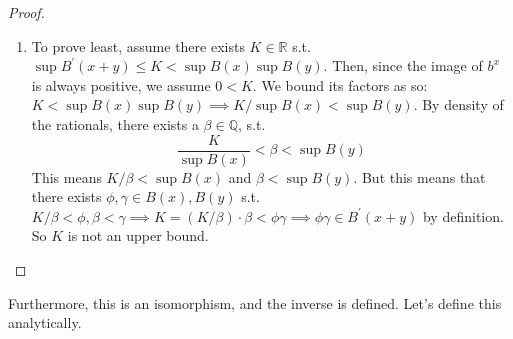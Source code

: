 \begin{proof}
\begin{enumerate}
      \item To prove least, assume there exists $K \in \mathbb{R}$ s.t. $\sup{B^\prime(x + y)} \leq K < \sup{B(x)} \sup{B(y)}$. Then, since the image of $b^x$ is always positive, we assume $0 < K$. We bound its factors as so: $K < \sup{B(x)} \sup{B(y)} \implies K/\sup{B(x)} < \sup{B(y)}$. By density of the rationals, there exists a $\beta \in \mathbb{Q}$, s.t. 
      \begin{equation}
        \frac{K}{\sup{B(x)}} < \beta < \sup{B(y)}
      \end{equation}
      This means $K/\beta < \sup{B(x)}$ and $\beta < \sup{B(y)}$. But this means that there exists $\phi, \gamma \in B(x), B(y)$ s.t. $K/\beta < \phi, \beta < \gamma \implies K = (K/\beta) \cdot \beta < \phi \gamma \implies \phi \gamma \in B^\prime(x + y)$ by definition. So $K$ is not an upper bound. 
      \end{enumerate}
    \end{proof}

    Furthermore, this is an isomorphism, and the inverse is defined. Let's define this analytically. 

